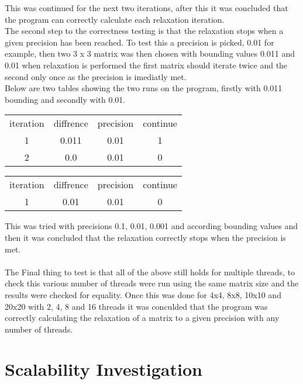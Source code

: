 \documentclass{article}
\begin{document}
This was continued for the next two iterations, after this it was concluded that
the program can correctly calculate each relaxation iteration.\\
The second step to the correctness testing is that the relaxation stops when a given
precision has been reached. To test this a precision is picked, 0.01 for example,
then two 3 x 3 matrix was then chosen with bounding values 0.011 and 0.01 when relaxation
is performed the first matrix should iterate twice and the second only once as the precision
is imediatly met.\\
Below are two tables showing the two runs on the program, firstly with 0.011 bounding
and secondly with 0.01.

\begin{center}
\begin{tabular}{ c c c c }
iteration & diffrence & precision & continue \\
 1 & 0.011 & 0.01 & 1\\
 2 & 0.0 & 0.01 & 0\\
\end{tabular}
\end{center}

\begin{center}
\begin{tabular}{ c c c c }
iteration & diffrence & precision & continue \\
 1 & 0.01 & 0.01 & 0\\
\end{tabular}
\end{center}

This was tried with precisions 0.1, 0.01, 0.001 and according bounding values and
then it was concluded that the relaxation correctly stops when the precision is met.\\~\\

The Final thing to test is that all of the above still holds for multiple threads,
to check this various number of threads were run using the same matrix size and the results
were checked for equality. Once this was done for 4x4, 8x8, 10x10 and 20x20 with
2, 4, 8 and 16 threads it was conculded that the program was correctly calculating
the relaxation of a matrix to a given precision with any number of threads.

\section{Scalability Investigation}
\end{document}
